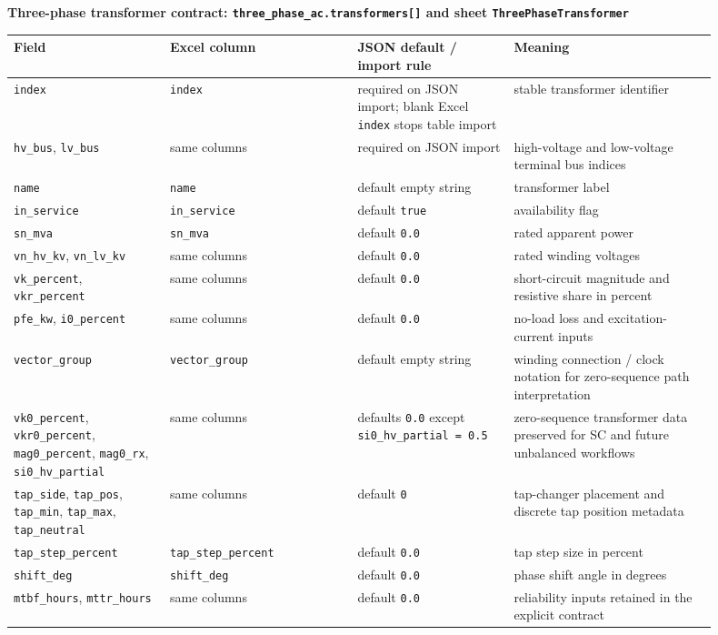 \noindent\textbf{Three-phase transformer contract: \texttt{three\_phase\_ac.transformers[]} and sheet \texttt{ThreePhaseTransformer}}

\begin{longtable}{L{0.20\linewidth}L{0.24\linewidth}L{0.20\linewidth}L{0.26\linewidth}}
\toprule
Field & Excel column & JSON default / import rule & Meaning \\
\midrule
\endhead
\texttt{index} & \texttt{index} & required on JSON import; blank Excel \texttt{index} stops table import & stable transformer identifier \\
\texttt{hv\_bus}, \texttt{lv\_bus} & same columns & required on JSON import & high-voltage and low-voltage terminal bus indices \\
\texttt{name} & \texttt{name} & default empty string & transformer label \\
\texttt{in\_service} & \texttt{in\_service} & default \texttt{true} & availability flag \\
\texttt{sn\_mva} & \texttt{sn\_mva} & default \texttt{0.0} & rated apparent power \\
\texttt{vn\_hv\_kv}, \texttt{vn\_lv\_kv} & same columns & default \texttt{0.0} & rated winding voltages \\
\texttt{vk\_percent}, \texttt{vkr\_percent} & same columns & default \texttt{0.0} & short-circuit magnitude and resistive share in percent \\
\texttt{pfe\_kw}, \texttt{i0\_percent} & same columns & default \texttt{0.0} & no-load loss and excitation-current inputs \\
\texttt{vector\_group} & \texttt{vector\_group} & default empty string & winding connection / clock notation for zero-sequence path interpretation \\
\texttt{vk0\_percent}, \texttt{vkr0\_percent}, \texttt{mag0\_percent}, \texttt{mag0\_rx}, \texttt{si0\_hv\_partial} & same columns & defaults \texttt{0.0} except \texttt{si0\_hv\_partial = 0.5} & zero-sequence transformer data preserved for SC and future unbalanced workflows \\
\texttt{tap\_side}, \texttt{tap\_pos}, \texttt{tap\_min}, \texttt{tap\_max}, \texttt{tap\_neutral} & same columns & default \texttt{0} & tap-changer placement and discrete tap position metadata \\
\texttt{tap\_step\_percent} & \texttt{tap\_step\_percent} & default \texttt{0.0} & tap step size in percent \\
\texttt{shift\_deg} & \texttt{shift\_deg} & default \texttt{0.0} & phase shift angle in degrees \\
\texttt{mtbf\_hours}, \texttt{mttr\_hours} & same columns & default \texttt{0.0} & reliability inputs retained in the explicit contract \\
\bottomrule
\end{longtable}

